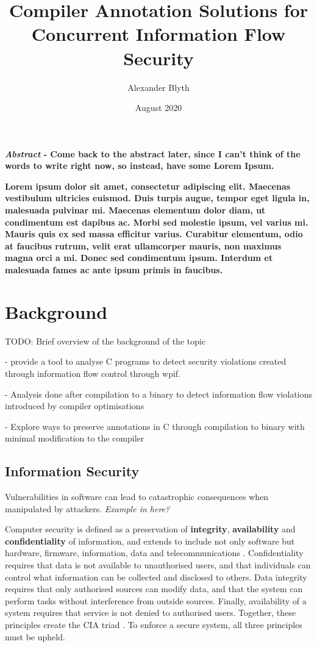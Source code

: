 \documentclass[twocolumn]{article}
\title{Compiler Annotation Solutions for Concurrent Information Flow Security}
\author{Alexander Blyth}
\date{August 2020}
\begin{document}
\maketitle



\textbf{\textit{Abstract} - Come back to the abstract later, since I can't think of the words to write right now, so instead, have some Lorem Ipsum.}

\textbf{Lorem ipsum dolor sit amet, consectetur adipiscing elit. Maecenas vestibulum ultricies euismod. Duis turpis augue, tempor eget ligula in, malesuada pulvinar mi. Maecenas elementum dolor diam, ut condimentum est dapibus ac. Morbi sed molestie ipsum, vel varius mi. Mauris quis ex sed massa efficitur varius. Curabitur elementum, odio at faucibus rutrum, velit erat ullamcorper mauris, non maximus magna orci a mi. Donec sed condimentum ipsum. Interdum et malesuada fames ac ante ipsum primis in faucibus.}

\section{Background}
TODO: Brief overview of the background of the topic

- provide a tool to analyse C programs to detect security violations created through information flow control through wpif.

- Analysis done after compilation to a binary to detect information flow violations introduced by compiler optimisations

- Explore ways to preserve annotations in C through compilation to binary with minimal modification to the compiler

\subsection{Information Security}
Vulnerabilities in software can lead to catastrophic consequences when manipulated by attackers. \textit{Example in here?}

Computer security is defined as a preservation of \textbf{integrity}, \textbf{availability} and \textbf{confidentiality} of information, and extends to include not only software but hardware, firmware, information, data and telecommunications \cite{guttman1995introduction}.
Confidentiality requires that data is not available to unauthorised users, and that individuals can control what information can be collected and disclosed to others. Data integrity requires that only authorised sources can modify data, and that the system can perform tasks without interference from outside sources. Finally, availability of a system requires that service is not denied to authorised users. Together, these principles create the CIA triad \cite{stallings2012computer}. To enforce a secure system, all three principles must be upheld.
\end{document}
